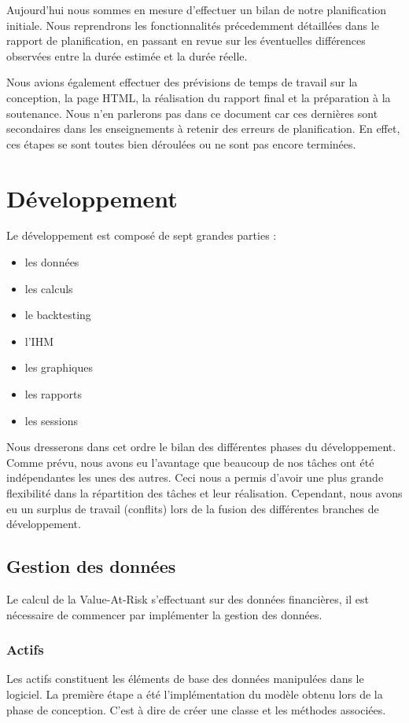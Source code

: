 \documentclass[a4paper]{report}
\begin{document}
Aujourd'hui nous sommes en mesure d'effectuer un bilan de notre planification initiale. Nous reprendrons les fonctionnalités précedemment détaillées dans le rapport de planification, en passant en revue sur les éventuelles différences observées entre la durée estimée et la durée réelle.

Nous avions également effectuer des prévisions de temps de travail sur la conception, la page HTML, la réalisation du rapport final et la préparation à la soutenance. Nous n'en parlerons pas dans ce document car ces dernières sont secondaires dans les enseignements à retenir des erreurs de planification. En effet, ces étapes se sont toutes bien déroulées ou ne sont pas encore terminées.


\chapter{Développement}
Le développement est composé de sept grandes parties :
\begin{itemize}
  \item les données
  \item les calculs
  \item le backtesting
  \item l'IHM
  \item les graphiques
  \item les rapports
  \item les sessions
\end{itemize}

Nous dresserons dans cet ordre le bilan des différentes phases du développement. Comme prévu, nous avons eu l'avantage que beaucoup de nos tâches ont été indépendantes les unes des autres. Ceci nous a permis d'avoir une plus grande flexibilité dans la répartition des tâches et leur réalisation. Cependant, nous avons eu un surplus de travail (conflits) lors de la fusion des différentes branches de développement.

\section{Gestion des données}
Le calcul de la Value-At-Risk s'effectuant sur des données financières, il est nécessaire de commencer par implémenter la gestion des données.

\subsection{Actifs}
Les actifs constituent les éléments de base des données manipulées dans le logiciel. La première étape a été l'implémentation du modèle obtenu lors de la phase de conception. C'est à dire de créer une classe et les méthodes associées.
\end{document}
